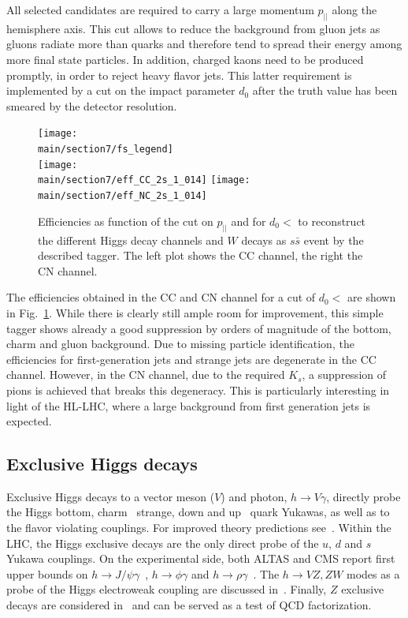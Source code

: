 \documentclass[../report.tex]{subfiles}
\providecommand{\main}{..}
\begin{document}
All selected candidates are required to carry a large momentum $p_{||}$ along the hemisphere
axis. This cut allows to reduce the background from gluon jets as gluons radiate more than quarks
and therefore tend to spread their energy among more final state particles. In addition, charged
kaons need to be produced promptly, in order to reject heavy flavor jets. This latter requirement is
implemented by a cut on the impact parameter $d_0$ after the truth value has been smeared by the
detector resolution.
\begin{figure}[tb]
  \centering
  \texttt{[image: \\main/section7/fs\_legend]}\\
  \texttt{[image: \\main/section7/eff\_CC\_2s\_1\_014]}
  \texttt{[image: \\main/section7/eff\_NC\_2s\_1\_014]}
  \caption{Efficiencies as function of the cut on $p_{||}$ and for $d_0<$ to
    reconstruct the different Higgs decay channels and $W$ decays as $s\bar s$ event by the
    described tagger. The left plot shows the CC channel, the right the CN channel.}
  \label{fig:stagger-efficiencies}
\end{figure}

The efficiencies obtained in the CC and CN channel for a cut of $d_0<$ are shown in
Fig.~\ref{fig:stagger-efficiencies}. While there is clearly still ample room for improvement, this
simple tagger shows already a good suppression by orders of magnitude of the bottom, charm and gluon
background. Due to missing particle identification, the efficiencies for first-generation jets and
strange jets are degenerate in the CC channel. However, in the CN channel, due to the required
$K_s$, a suppression of pions is achieved that breaks this degeneracy. This is particularly
interesting in light of the HL-LHC, where a large background from first generation jets is expected.


\subsection{Exclusive Higgs decays}

Exclusive Higgs decays to a vector meson ($V$) and photon, $h\to V\gamma$, directly probe the Higgs bottom, charm~\cite{Bodwin:2013gca,Bodwin:2014bpa} strange, down and up~\cite{Kagan:2014ila} quark Yukawas, as well as to the flavor violating couplings. 
For improved theory predictions see~\cite{Koenig:2015pha}.
Within the LHC, the Higgs exclusive decays are the only direct probe of the $u$, $d$ and $s$ Yukawa couplings. 
On the experimental side, both ALTAS and CMS report first upper bounds on $h\to J/\psi\gamma$~\cite{Aad:2015sda,Khachatryan:2015lga}, $h\to\phi\gamma$ and $h\to\rho\gamma$~\cite{Aaboud:2016rug,Aaboud:2017xnb}. 
The $h \to VZ, ZW$ modes as a probe of the Higgs electroweak coupling are discussed  in~\cite{Isidori:2013cla}. 
Finally, $Z$ exclusive decays are considered in~\cite{Grossmann:2015lea,Alte:2015dpo} and can be served as a test of QCD factorization. 
\end{document}
